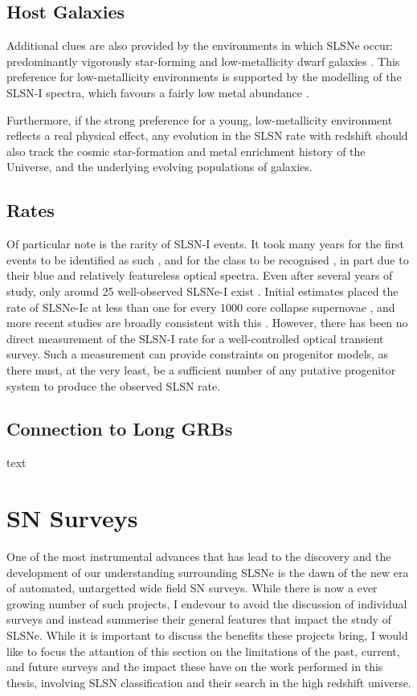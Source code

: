 \subsection{Host Galaxies}
Additional clues are also provided by the environments in which SLSNe occur: predominantly vigorously star-forming and low-metallicity dwarf galaxies \citep[e.g.,][]{2014ApJ...787..138L,2015MNRAS.449..917L,2016arXiv160504925C}. This preference for low-metallicity environments is supported by the modelling of the SLSN-I spectra, which favours a fairly low metal abundance \citep{2016MNRAS.458.3455M}.

Furthermore, if the strong preference for a young, low-metallicity environment reflects a real physical effect, any evolution in the SLSN rate with redshift should also track the cosmic star-formation and metal enrichment history of the Universe, and the underlying evolving populations of galaxies.

\subsection{Rates}
Of particular note is the rarity of SLSN-I events. It took many years for the first events to be identified as such \citep{2007ApJ...668L..99Q,2009ApJ...690.1358B}, and for the class to be recognised \citep{2011Natur.474..487Q}, in part due to their blue and relatively featureless optical spectra. Even after several years of study, only around 25 well-observed SLSNe-I exist \citep[e.g., see compilations in][]{2014ApJ...796...87I,2015MNRAS.449.1215P,2015MNRAS.452.3869N}. Initial estimates placed the rate of SLSNe-Ic at less than one for every 1000 core collapse supernovae \citep{2011Natur.474..487Q}, and more recent studies are broadly consistent with this \citep{2013MNRAS.431..912Q,2015MNRAS.448.1206M}. However, there has been no direct measurement of the SLSN-I rate for a well-controlled optical transient survey. Such a measurement can provide constraints on progenitor models, as there must, at the very least, be a sufficient number of any putative progenitor system to produce the observed SLSN rate.

\subsection{Connection to Long GRBs}
text

\section{SN Surveys}
One of the most instrumental advances that has lead to the discovery and the development of our understanding surrounding SLSNe is the dawn of the new era of automated, untargetted wide field SN surveys. While there is now a ever growing number of such projects, I endevour to avoid the discussion of individual surveys and instead summerise their general features that impact the study of SLSNe. While it is important to discuss the benefits these projects bring, I would like to focus the attantion of this section on the limitations of the past, current, and future surveys and the impact these have on the work performed in this thesis, involving SLSN classification and their search in the high redshift universe.

